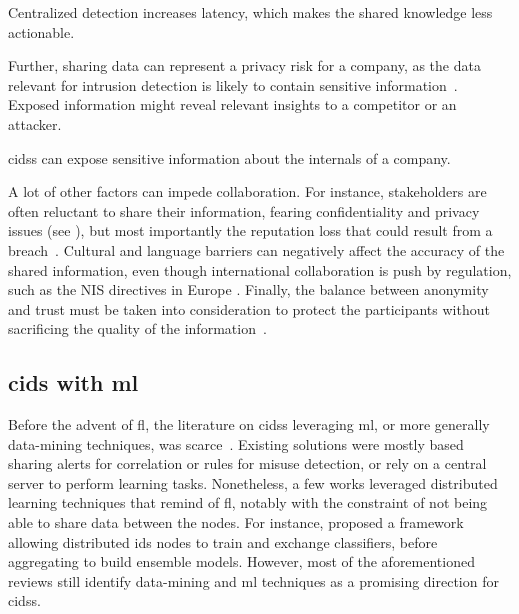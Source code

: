 \begin{challenge}
  Centralized detection increases latency, which makes the shared knowledge less actionable.
  \label{chall:actionability}
\end{challenge}

Further, sharing data can represent a privacy risk for a company, as the data relevant for intrusion detection is likely to contain sensitive information~\cite{zhou_surveycoordinatedattacks_2010}.
Exposed information might reveal relevant insights to a competitor or an attacker.


\begin{challenge}
  \Glspl{cids} can expose sensitive information about the internals of a company.
  \label{chall:privacy}
\end{challenge}

A lot of other factors can impede collaboration.
For instance, stakeholders are often reluctant to share their information, fearing confidentiality and privacy issues (see ), but most importantly the reputation loss that could result from a breach~\cite{pala_InformationSharingCybersecurity_2019}.
Cultural and language barriers can negatively affect the accuracy of the shared information, even though international collaboration is push by regulation, such as the NIS directives in Europe \cite{NIS_directive,NIS2}.
Finally, the balance between anonymity and trust must be taken into consideration to protect the participants without sacrificing the quality of the information~\cite{murdoch_AnonymityvsTrust_2015}.


\subsection{\Gls{cids} with \acrlong{ml}\label{sec:bg.collab.ml}}

Before the advent of \gls{fl}, the literature on \glspl{cids} leveraging \gls{ml}, or more generally data-mining techniques, was scarce~\cite{folino_Ensemblebasedcollaborative_2016}.
Existing solutions were mostly based sharing alerts for correlation or rules for misuse detection, or rely on a central server to perform learning tasks.
Nonetheless, a few works leveraged distributed learning techniques that remind of \gls{fl}, notably with the constraint of not being able to share data between the nodes.
For instance, \textcite{folino_ensemblebasedevolutionaryframework_2010} proposed a framework allowing distributed \gls{ids} nodes to train and exchange classifiers, before aggregating to build ensemble models.
However, most of the aforementioned reviews still identify data-mining and \gls{ml} techniques as a promising direction for \glspl{cids}.

